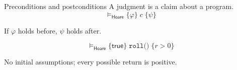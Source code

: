 \begin{frame}{Preconditions and postconditions}
  A judgment is a claim about a program.
  \[
    \vDash_{\mathsf{Hoare}}\{\varphi\}\;c\;\{\psi\}
  \]
  \begin{center}
    If $\varphi$ holds before, $\psi$ holds after.
  \end{center}
  \pause
  \vspace{1em}
  \[
    \vDash_{\mathsf{Hoare}}\{\mathsf{true}\}\;
      \texttt{roll()}\;\{r>0\}
  \]
  \begin{center}
    No initial assumptions; every possible return is positive.
  \end{center}
\end{frame}
